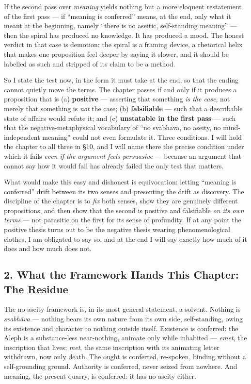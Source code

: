 \documentclass[11pt]{article}
\begin{document}
If the second pass over \emph{meaning} yields nothing but a more eloquent restatement of the first pass — if ``meaning is conferred'' means, at the end, only what it meant at the beginning, namely ``there is no aseitic, self-standing meaning'' — then the spiral has produced no knowledge. It has produced a mood. The honest verdict in that case is demotion: the spiral is a framing device, a rhetorical helix that makes one proposition feel deeper by saying it slower, and it should be labelled as such and stripped of its claim to be a method.

So I state the test now, in the form it must take at the end, so that the ending cannot quietly move the terms. The chapter passes if and only if it produces a proposition that is (a) \textbf{positive} — asserting that something \emph{is the case}, not merely that something is \emph{not} the case; (b) \textbf{falsifiable} — such that a describable state of affairs would refute it; and (c) \textbf{unstatable in the first pass} — such that the negative-metaphysical vocabulary of ``no svabhāva, no aseity, no mind-independent meaning'' could not even formulate it. Three conditions. I will hold the chapter to all three in §10, and I will name there the precise condition under which it fails \emph{even if the argument feels persuasive} — because an argument that cannot say how it would fail has already failed the only test that matters.

What would make this easy and dishonest is equivocation: letting ``meaning is conferred'' drift between its two senses and presenting the drift as discovery. The discipline of the chapter is to \emph{fix} both senses, show they are genuinely different propositions, and then show that the second is positive and falsifiable \emph{on its own terms} — not parasitic on the first for its sense of profundity. If at any point the positive thesis turns out to be the negative thesis wearing phenomenological clothes, I am obligated to say so, and at the end I will say exactly how much of it does and how much does not.

\subsection*{2. What the Framework Hands This Chapter: The Residue}

The no-aseity framework is, in its most general statement, a solvent. Nothing is \emph{svabhāva} — nothing bears its own nature from its own side, self-standing, owing its existence and character to nothing outside itself. Existence is conferred: the Aleph is a substance-less near-nothing, animate only while inhabited — \emph{emet}, the inscription that lives; \emph{met}, the same inscription with its animating letter withdrawn, now only death. The ought is conferred, re-spoken, binding without a self-grounding ground. Authority is conferred, never seized from nowhere. And meaning, the present quarry, is conferred: it has no aseity either.
\end{document}
